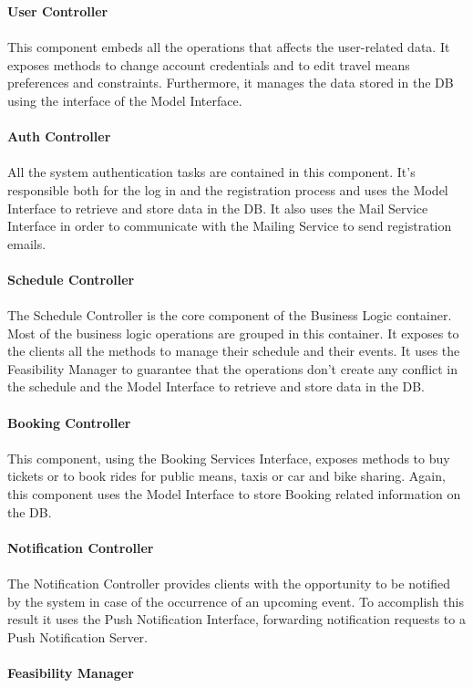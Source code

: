 \newpage
\noindent
\textbf{User Controller}
\\ \\
This component embeds all the operations that affects the user-related data. It exposes methods to change account credentials and to edit travel means preferences and constraints. Furthermore, it manages the data stored in the DB using the interface of the Model Interface. 
\\ \\
\textbf{Auth Controller}
\\ \\
All the system authentication tasks are contained in this component. It's responsible both for the log in and the registration process and uses the Model Interface to retrieve and store data in the DB. It also uses the Mail Service Interface in order to communicate with the Mailing Service to send registration emails.
\\ \\
\textbf{Schedule Controller}
\\ \\
The Schedule Controller is the core component of the Business Logic container. Most of the business logic operations are grouped in this container. It exposes to the clients all the methods to manage their schedule and their events. It uses the Feasibility Manager to guarantee that the operations don't create any conflict in the schedule and the Model Interface to retrieve and store data in the DB.
\\ \\
\textbf{Booking Controller}
\\ \\
This component, using the Booking Services Interface, exposes methods to buy tickets or to book rides for public means, taxis or car and bike sharing. Again, this component uses the Model Interface to store Booking related information on the DB.
\\ \\
\textbf{Notification Controller}
\\ \\
The Notification Controller provides clients with the opportunity to be notified by the system in case of the occurrence of an upcoming event. To accomplish this result it uses the Push Notification Interface, forwarding notification requests to a Push Notification Server.
\\ \\
\textbf{Feasibility Manager}
\\ \\
